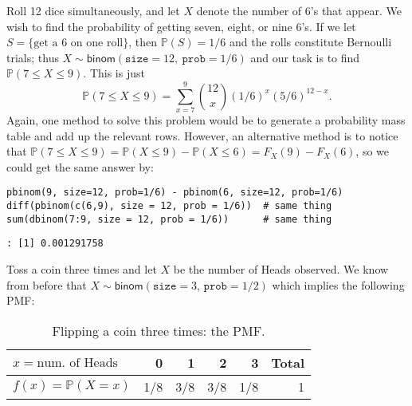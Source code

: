 Roll 12 dice simultaneously, and let \(X\) denote the number of 6's
that appear. We wish to find the probability of getting seven, eight,
or nine 6's. If we let \(S=\{ \mbox{get a 6 on one roll} \} \), then
\(\mathbb{P}(S)=1/6\) and the rolls constitute Bernoulli trials; thus
\(X\sim\mathsf{binom}(\mathtt{size}=12,\ \mathtt{prob}=1/6)\) and our
task is to find \(\mathbb{P}(7\leq X\leq9)\). This is just
\[ 
\mathbb{P}(7\leq X\leq9)=\sum_{x=7}^{9}{12 \choose x}(1/6)^{x}(5/6)^{12-x}.
\]
Again, one method to solve this problem would be to generate a
probability mass table and add up the relevant rows. However, an
alternative method is to notice that \(\mathbb{P}(7\leq
X\leq9)=\mathbb{P}(X\leq9)-\mathbb{P}(X\leq6)=F_{X}(9)-F_{X}(6)\), so
we could get the same answer by:

\begin{Verbatim}
pbinom(9, size=12, prob=1/6) - pbinom(6, size=12, prob=1/6)
diff(pbinom(c(6,9), size = 12, prob = 1/6))  # same thing
sum(dbinom(7:9, size = 12, prob = 1/6))      # same thing
\end{Verbatim}

\begin{verbatim}
: [1] 0.001291758
\end{verbatim}



\label{exa-toss-coin-3-withR} Toss a coin three times and let \(X\) be the
number of Heads observed. We know from before that
\(X\sim\mathsf{binom}(\mathtt{size}=3,\,\mathtt{prob}=1/2)\) which
implies the following PMF:

\begin{table}[htb]
\caption[Flipping a coin thrice: PMF]{\label{tab-flip-coin-thrice}Flipping a coin three times: the PMF.}
\centering
\begin{tabular}{lrrrrr}
\(x=\mbox{num. of Heads}\) & 0 & 1 & 2 & 3 & Total\\
\hline
\(f(x) = \mathbb{P}(X = x)\) & 1/8 & 3/8 & 3/8 & 1/8 & 1\\
\end{tabular}
\end{table}

